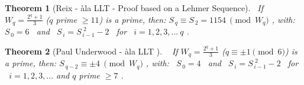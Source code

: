 \documentclass[latin1]{quadrature}
\newcommand{\PMod}[1]{\!\!\pmod{#1}}
\newtheorem{theorem}{Theorem}
\newif\ifenfrancais
\begin{document}
\begin{article}
\begin{article}
\vspace{-.1in}

\ifenfrancais
\begin{theorem}[Reix - \`ala LLT - Preuve bas\'ee sur une S\'equence de Lehmer - Cycle du DiGraph]
\ 
\newline
Si $W_q = \frac{ 2^{\scriptstyle q} + 1}{3}$ ($q$ premier $\geqslant 11$) est premier, alors :
$S_{\,q} \equiv S_{\,2}=1154 \ \PMod{W_q}$ ,
avec : \ $S_{\,0} = 6$ \ et \ $S_{\,i} = S_{\,i-1}^{\,\,2} - 2$ \ pour \ $i=1,2,3, ... \ q$ .
\end{theorem}
\else
\begin{theorem}[Reix - \`ala LLT - Proof based on a Lehmer Sequence]
\ 
If $W_q = \frac{ 2^{\scriptstyle q} + 1}{3}$ ($q$ prime $\geqslant 11$) is a prime, then:
$S_{\,q} \equiv S_{\,2}=1154 \ \PMod{W_q}$ ,
with: \ $S_{\,0} = 6$ \ and \ $S_{\,i} = S_{\,i-1}^{\,\,2} - 2$ \ for \ $i=1,2,3, ... \ q$ .
\end{theorem}
\fi

\vspace{-.1in}

\ifenfrancais
\begin{theorem}[Paul Underwood - \`ala LLT ]
\ 
\newline
Si $W_q = \frac{ 2^{\scriptstyle q} + 1}{3}$ ($q \equiv \pm 1 \PMod{6}$) est premier, alors :
$S_{\,q-2} \equiv \pm 4 \ \PMod{W_q}$ ,
avec : \ $S_{\,0} = 4$ \ et \ $S_{\,i} = S_{\,i-1}^{\,\,2} - 2$ \ pour \ $i=1,2,3, ... $ et $q$ premier $\geqslant 7$ .

\end{theorem}
\else
\begin{theorem}[Paul Underwood - \`ala LLT ]
\ 
\newline
If $W_q = \frac{ 2^{\scriptstyle q} + 1}{3}$ ($q \equiv \pm 1 \PMod{6}$) is a prime, then:
$S_{\,q-2} \equiv \pm 4 \ \PMod{W_q}$ ,
with: \ $S_{\,0} = 4$ \ and \ $S_{\,i} = S_{\,i-1}^{\,\,2} - 2$ \ for \ $i=1,2,3, ... $ and $q$ prime $\geqslant 7$ .

\end{theorem}
\fi



\end{article}
\end{article}
\end{document}
